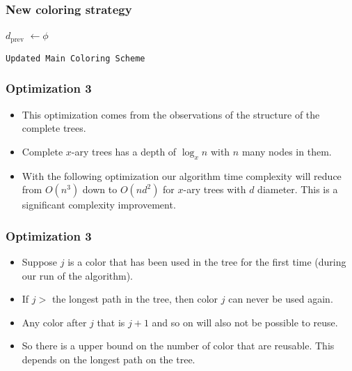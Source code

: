 \begin{frame}
    \frametitle{New coloring strategy}

    \begin{algorithm}[H]
         {
            $d_{\text{prev}}$ $\gets \phi$\;
             {
            }
        }
        \caption{\texttt{Updated Main Coloring Scheme}}
    \end{algorithm}
    
\end{frame}


\begin{frame}
    \frametitle{Optimization 3}

    
    \begin{itemize}
        \item This optimization comes from the observations of the structure of the complete trees.\pause
        \item Complete $x$-ary trees has a depth of $\log_{x} n$ with $n$ many nodes in them.\pause[]
        \item With the following optimization our algorithm time complexity will reduce from $O(n^3)$ down to $O(n d^2)$ for $x$-ary trees with $d$ diameter. This is a significant complexity improvement.
    \end{itemize}    

\end{frame}

\begin{frame}
    \frametitle{Optimization 3}

    
    \begin{itemize}
        \item Suppose $j$ is a color that has been used in the tree for the first time (during our run of the algorithm).\pause[] 
        \item If $j >$ the longest path in the tree, then color $j$ can never be used again.\pause[]
        \item Any color after $j$ that is $j + 1$ and so on will also not be possible to reuse.\pause[]
        \item So there is a upper bound on the number of color that are reusable. This depends on the longest path on the tree.
    \end{itemize}    

\end{frame}